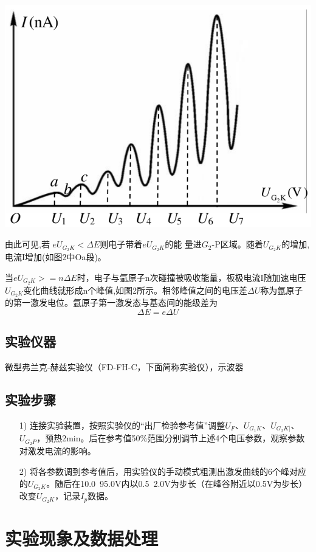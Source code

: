 \documentclass[UEF8]{ctexart}
\begin{document}
\begin{multicols}{2}
\includegraphics[scale=0.30]{p2.png}

由此可见,若 $eU_{G_{2}K}<\Delta{E}$则电子带着$eU_{G_{2}K}$的能
量进$G_{2}$-P区域。随着$U_{G_{2}K}$的增加,电流I增加(如图2中Oa段)。

当$eU_{G_{2}K}>=n\Delta{E}$时，电子与氩原子n次碰撞被吸收能量，板极电流I随加速电压$U_{G_{2}K}$变化曲线就形成n个峰值,如图2所示。相邻峰值之间的电压差$\Delta{U}$称为氩原子的第一激发电位。氩原子第一激发态与基态间的能级差为$$\Delta{E}=e\Delta{U}$$

\subsection{实验仪器}
微型弗兰克-赫兹实验仪（FD-FH-C，下面简称实验仪），示波器

\subsection{实验步骤}
\begin{enumerate}	
	\item[1)] 连接实验装置，按照实验仪的“出厂检验参考值”调整$U_{F}$、$U_{G_{1}K}$、$U_{G_{2}K]}$、$U_{G_{2}P}$，预热2min。后在参考值50\%范围分别调节上述4个电压参数，观察参数对激发电流的影响。
	\item[2)]
	将各参数调到参考值后，用实验仪的手动模式粗测出激发曲线的6个峰对应的$U_{G_{2}K}$。随后在10.0~95.0V内以0.5~2.0V为步长（在峰谷附近以0.5V为步长）改变$U_{G_{2}K}$，记录$I_{p}$数据。
\end{enumerate}

\section{实验现象及数据处理}

\end{multicols}
\end{document}
